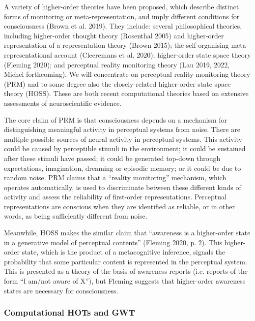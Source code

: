 \documentclass[12pt]{article}
\begin{document}
A variety of higher-order theories have been proposed, which describe distinct forms of monitoring or meta-representation, and imply different conditions for consciousness (Brown et al. 2019).  They include: several philosophical theories, including higher-order thought theory (Rosenthal 2005) and higher-order representation of a representation theory (Brown 2015); the self-organising meta-representational account (Cleeremans et al. 2020); higher-order state space theory (Fleming 2020); and perceptual reality monitoring theory (Lau 2019, 2022, Michel forthcoming). We will concentrate on perceptual reality monitoring theory (PRM) and to some degree also the closely-related higher-order state space theory (HOSS). These are both recent computational theories based on extensive assessments of neuroscientific evidence.

The core claim of PRM is that consciousness depends on a mechanism for distinguishing meaningful activity in perceptual systems from noise. There are multiple possible sources of neural activity in perceptual systems. This activity could be caused by perceptible stimuli in the environment; it could be sustained after these stimuli have passed; it could be generated top-down through expectations, imagination, dreaming or episodic memory; or it could be due to random noise. PRM claims that a ``reality monitoring'' mechanism, which operates automatically, is used to discriminate between these different kinds of activity and assess the reliability of first-order representations. Perceptual representations are conscious when they are identified as reliable, or in other words, as being sufficiently different from noise.

Meanwhile, HOSS makes the similar claim that ``awareness is a higher-order state in a generative model of perceptual contents'' (Fleming 2020, p. 2). This higher-order state, which is the product of a metacognitive inference, signals the probability that some particular content is represented in the perceptual system. This is presented as a theory of the basis of awareness reports (i.e. reports of the form ``I am/not aware of X''), but Fleming suggests that higher-order awareness states are necessary for consciousness.

\subsubsection{Computational HOTs and GWT}
\end{document}
